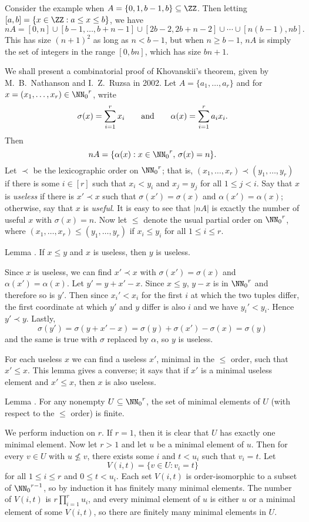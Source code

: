 Consider the example when $A = \{0,1,b-1,b\} \subseteq \ZZ$. Then letting $[a,b] = \{x\in \ZZ : a\le x\le b\}$,
we have
$$nA = [0, n] \cup [b-1,\ldots, b+n-1] \cup [2b-2, 2b+n-2] \cup\cdots\cup [n(b-1),nb].$$
This has size $(n+1)^2$ as long as $n< b-1$, but when $n\ge b-1$, $nA$ is simply the set
of integers in the range $[0,bn]$, which has size $bn+1$.

We shall present a combinatorial proof of Khovanskii's theorem,
given by M.~B.~Nathanson and I.~Z.~Ruzsa in 2002.
Let $A = \{a_1,\ldots, a_r\}$ and
for $x = (x_1,\ldots, x_r)\in {\NN_0}^r$, write
$$\sigma(x) = \sum_{i=1}^r x_i\qquad\hbox{and}\qquad
\alpha(x) = \sum_{i=1}^r a_ix_i.$$
Then
$$nA = \{ \alpha(x) : x\in {\NN_0}^r,\, \sigma(x) = n\}.$$
Let $\prec$ be the lexicographic order on ${\NN_0}^r$; that is, $(x_1,\ldots,x_r)\prec (y_1,\ldots,y_r)$
if there is some $i\in [r]$ such that $x_i<y_i$ and $x_j = y_j$ for all $1\le j<i$.
Say that $x$ is {\it useless} if there is $x'\prec x$ such that $\sigma(x') = \sigma(x)$ and
$\alpha(x') = \alpha(x)$; otherwise, say that $x$ is {\it useful}. It is easy to see that
$|nA|$ is exactly the number of useful $x$ with $\sigma(x) = n$. Now let $\le$ denote
the usual partial order on ${\NN_0}^r$, where $(x_1,\ldots,x_r)\le (y_1,\ldots,y_r)$
if $x_i\le y_i$ for all $1\le i\le r$.

\proclaim Lemma {\advthm}. If $x\le y$ and $x$ is useless, then $y$ is useless.

\proof Since $x$ is useless, we can find $x'\prec x$ with $\sigma(x') = \sigma(x)$ and $\alpha(x') = \alpha(x)$.
Let $y' = y+x'-x$. Since $x\le y$, $y-x$ is in ${\NN_0}^r$ and therefore so is $y'$. Then since
$x_i' < x_i$ for the first $i$ at which the two tuples differ, the first coordinate at which $y'$ and
$y$ differ is also $i$ and we have $y_i'<y_i$. Hence $y'\prec y$. Lastly,
$$\sigma(y') = \sigma(y+x'-x) = \sigma(y) + \sigma(x') - \sigma(x) = \sigma(y)$$
and the same is true with $\sigma$ replaced by $\alpha$, so $y$ is useless.\slug

For each useless $x$ we can find a useless $x'$, minimal in the $\le$ order, such that $x'\le x$.
This lemma gives a converse; it says that if $x'$ is a minimal useless element and $x'\le x$, then
$x$ is also useless.

\edef\lemminimalfinite{\the\thmcount}
\proclaim Lemma {\advthm}. For any nonempty $U\subseteq {\NN_0}^r$, the set of minimal elements of
$U$ (with respect to the $\le$ order) is finite.

\proof We perform induction on $r$. If $r=1$, then it is clear that $U$ has exactly one minimal element.
Now let $r>1$ and let $u$ be a minimal element of $u$. Then for every $v\in U$ with $u\not\le v$,
there exists some $i$ and $t< u_i$ such that $v_i = t$. Let
$$V(i,t) = \{v\in U : v_i = t\}$$
for all $1\le i\le r$ and $0\le t<u_i$. Each set $V(i,t)$ is order-isomorphic to a subset of ${\NN_0}^{r-1}$,
so by induction it has finitely many minimal elements. The number of $V(i,t)$ is $r\prod_{i=1}^r u_i$,
and every minimal element of $u$ is either $u$ or a minimal element of some $V(i,t)$, so there are
finitely many minimal elements in $U$.\slug

